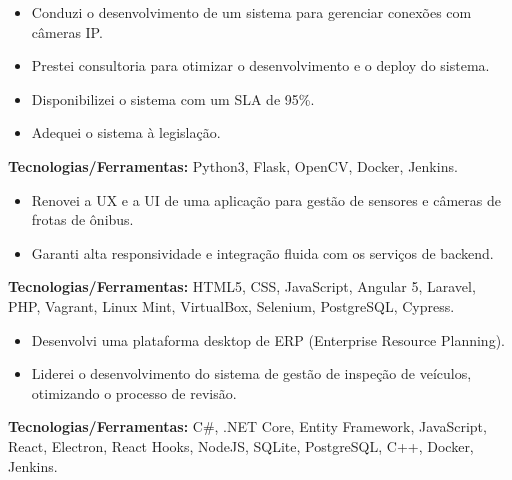 \documentclass[10pt,a4paper]{altacv}
\begin{document}
\vspace{5mm}

\begin{itemize}
    \setlength{\itemindent}{0.5em}
    \item[--] Conduzi o desenvolvimento de um sistema para gerenciar conexões com câmeras IP.
    \item[--] Prestei consultoria para otimizar o desenvolvimento e o deploy do sistema.
    \item[--] Disponibilizei o sistema com um SLA de 95\%.
    \item[--] Adequei o sistema à legislação.
\end{itemize}
\textbf{Tecnologias/Ferramentas:} Python3, Flask, OpenCV, Docker, Jenkins.
\vspace{5mm}

\begin{itemize}
    \setlength{\itemindent}{0.5em}
    \item[--] Renovei a UX e a UI de uma aplicação para gestão de sensores e câmeras de frotas de ônibus.
    \item[--] Garanti alta responsividade e integração fluida com os serviços de backend.
\end{itemize}
\textbf{Tecnologias/Ferramentas:} HTML5, CSS, JavaScript, Angular 5, Laravel, PHP, Vagrant, Linux Mint, VirtualBox, Selenium, PostgreSQL, Cypress.
\vspace{5mm}

\begin{itemize}
    \setlength{\itemindent}{0.5em}
    \item[--] Desenvolvi uma plataforma desktop de ERP (Enterprise Resource Planning).
    \item[--] Liderei o desenvolvimento do sistema de gestão de inspeção de veículos, otimizando o processo de revisão.
\end{itemize}
\textbf{Tecnologias/Ferramentas:} C\#, .NET Core, Entity Framework, JavaScript, React, Electron, React Hooks, NodeJS, SQLite, PostgreSQL, C++, Docker, Jenkins.
\vspace{5mm}
\end{document}
